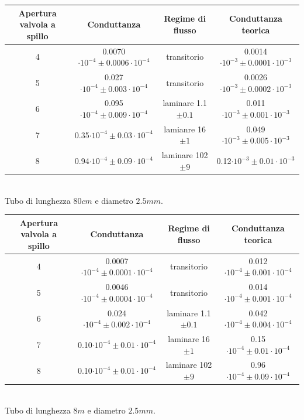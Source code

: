\documentclass[a4paper,11pt]{article}
\begin{document}
\begin{center}
\begin{tabular}{|c|c|c|c|}
\hline Apertura valvola a spillo & Conduttanza & Regime di flusso & Conduttanza teorica \\ 
\hline 4 & 0.0070$\cdot10^{-4}\pm 0.0006\cdot10^{-4}$ & transitorio & 0.0014$\cdot10^{-3}\pm 0.0001\cdot10^{-3}$ \\ 
\hline 5 & 0.027$\cdot10^{-4}\pm 0.003\cdot10^{-4}$ & transitorio & 0.0026$\cdot10^{-3}\pm 0.0002\cdot10^{-3}$ \\ 
\hline 6 & 0.095$\cdot10^{-4}\pm 0.009\cdot10^{-4}$ & laminare 1.1$\pm0.1$ & 0.011$\cdot10^{-3}\pm 0.001\cdot10^{-3}$\\
\hline 7 & 0.35$\cdot10^{-4}\pm 0.03\cdot10^{-4}$ & lamianre 16$\pm1$ & 0.049$\cdot10^{-3}\pm 0.005\cdot10^{-3}$ \\
\hline 8 & 0.94$\cdot10^{-4}\pm 0.09\cdot10^{-4}$ & laminare 102$\pm9$ & 0.12$\cdot10^{-3}\pm 0.01\cdot10^{-3}$ \\ 
\hline 
\end{tabular}\\
\vspace{5pt}
Tubo di lunghezza $80cm$ e diametro $2.5mm$.
\\
\vspace{15pt}
\begin{tabular}{|c|c|c|c|}
\hline Apertura valvola a spillo & Conduttanza & Regime di flusso & Conduttanza teorica \\ 
\hline 4 & 0.0007$\cdot10^{-4}\pm 0.0001\cdot10^{-4}$ & transitorio & 0.012$\cdot10^{-4}\pm 0.001\cdot10^{-4}$ \\ 
\hline 5 & 0.0046$\cdot10^{-4}\pm 0.0004\cdot10^{-4}$ & transitorio & 0.014$\cdot10^{-4}\pm 0.001\cdot10^{-4}$ \\ 
\hline 6 & 0.024$\cdot10^{-4}\pm 0.002\cdot10^{-4}$ & laminare 1.1$\pm0.1$ & 0.042$\cdot10^{-4}\pm 0.004\cdot10^{-4}$ \\
\hline 7 & 0.10$\cdot10^{-4}\pm 0.01\cdot10^{-4}$ & laminare 16$\pm1$ & 0.15$\cdot10^{-4}\pm 0.01\cdot10^{-4}$ \\
\hline 8 & 0.10$\cdot10^{-4}\pm 0.01\cdot10^{-4}$ & laminare 102$\pm9$ & 0.96$\cdot10^{-4}\pm 0.09\cdot10^{-4}$ \\ 
\hline 
\end{tabular}\\
\vspace{5pt}
Tubo di lunghezza $8m$ e diametro $2.5mm$.
\\
\vspace{15pt}
\begin{tabular}{|c|c|c|c|}

\end{tabular}
\end{center}
\end{document}
